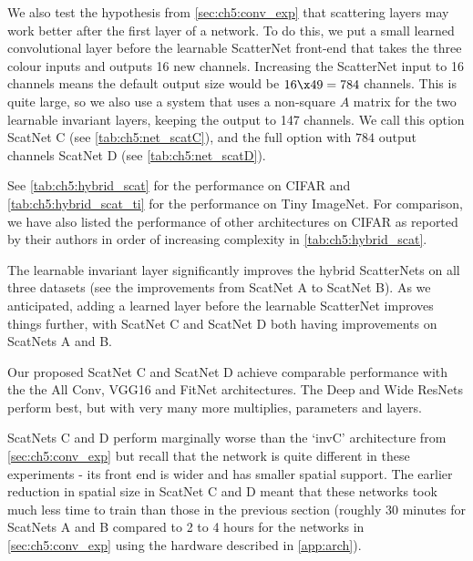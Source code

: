We also test the hypothesis from \autoref{sec:ch5:conv_exp} that scattering layers may 
work better after the first layer of a network. To do this, we put a small
learned convolutional layer before the learnable ScatterNet front-end that takes the
three colour inputs and outputs 16 new channels. Increasing the ScatterNet input
to 16 channels means the default output size would be $16\x 49=784$ channels.
This is quite large, so we also use a system that uses a non-square $A$ matrix
for the two learnable invariant layers, keeping the output to 147 channels. We call this
option ScatNet C (see \autoref{tab:ch5:net_scatC}), and the full option with 
$784$ output channels ScatNet D (see \autoref{tab:ch5:net_scatD}). 

See
\autoref{tab:ch5:hybrid_scat} for the performance on CIFAR and
\autoref{tab:ch5:hybrid_scat_ti} for the performance on Tiny ImageNet.
For comparison, we have also listed the performance of other architectures on
CIFAR as reported by their authors in order of increasing complexity in
\autoref{tab:ch5:hybrid_scat}. 

The learnable invariant layer significantly improves the hybrid ScatterNets on
all three datasets (see the improvements from ScatNet A to ScatNet B).
As we anticipated, adding a learned layer before the learnable ScatterNet
improves things further, with ScatNet C and ScatNet D both having improvements on
ScatNets A and B.

Our proposed ScatNet C and ScatNet D achieve
comparable performance with the the All Conv, VGG16 and FitNet architectures.
The Deep\cite{he_deep_2016} and Wide\cite{zagoruyko_wide_2016} ResNets perform
best, but with very many more multiplies, parameters and layers.

ScatNets C and D perform marginally worse than the `invC' architecture from
\autoref{sec:ch5:conv_exp} but recall that the network is
quite different in these experiments - its front end is wider and has smaller
spatial support. The earlier reduction in spatial size in ScatNet C and D
meant that these networks took much less time to train
than those in the previous section (roughly 30 minutes for ScatNets A and B
compared to 2 to 4 hours for the networks in \autoref{sec:ch5:conv_exp} using
the hardware described in \autoref{app:arch}).


